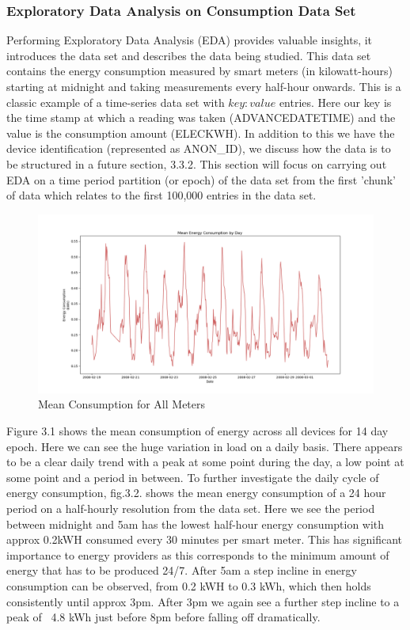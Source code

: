         \subsubsection{Exploratory Data Analysis on Consumption Data Set}
        Performing Exploratory Data Analysis (EDA) provides valuable insights, it introduces the data set and describes the data being studied. This data set contains the energy consumption measured by smart meters (in kilowatt-hours) starting at midnight and taking measurements every half-hour onwards. This is a classic example of a time-series data set with $key:value$ entries. Here our key is the time stamp at which a reading was taken (ADVANCEDATETIME) and the value is the consumption amount (ELECKWH). In addition to this we have the device identification (represented as ANON\_ID), we discuss how the data is to be structured in a future section, 3.3.2. This section will focus on carrying out EDA on a time period partition (or epoch) of the data set from the first 'chunk' of data which relates to the first 100,000 entries in the data set. 
        
        \begin{figure}[H]
        \centering     
        \includegraphics[width=1\textwidth]{Figures/EDA_images/mean_consumption_day.png}
        \caption{Mean Consumption for All Meters}
        \label{fig:Mean Consumption}
        \end{figure} 
        
        Figure 3.1 shows the mean consumption of energy across all devices for 14 day epoch.  Here we can see the huge variation in load on a daily basis. There appears to be a clear daily trend with a peak at some point during the day, a low point at some point and a period in between. To further investigate the daily cycle of energy consumption, fig.3.2. shows the mean energy consumption of a 24 hour period on a half-hourly resolution from the data set. Here we see the period between midnight and 5am has the lowest half-hour energy consumption with approx 0.2kWH consumed every 30 minutes per smart meter. This has significant importance to energy providers as this corresponds to the minimum amount of energy that has to be produced 24/7. After 5am a step incline in energy consumption can be observed, from 0.2 kWH to 0.3 kWh, which then holds consistently until approx 3pm. After 3pm we again see a further step incline to a peak of ~4.8 kWh just before 8pm before falling off dramatically.
        
